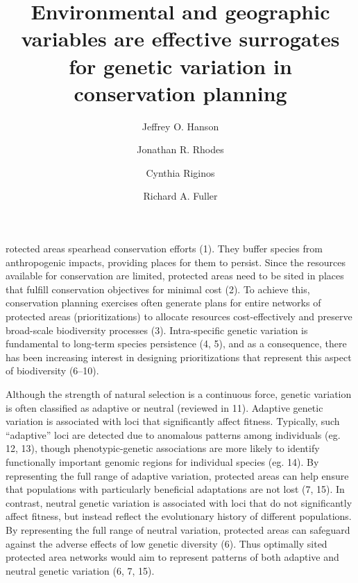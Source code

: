 \documentclass[9pt,twocolumn,twoside,lineno]{pnas-new}
\title{Environmental and geographic variables are effective surrogates for
genetic variation in conservation planning}
\author[a,1]{Jeffrey O. Hanson}
\author[b]{Jonathan R. Rhodes}
\author[a]{Cynthia Riginos}
\author[a]{Richard A. Fuller}
\affil[a]{School of Biological Sciences, The University of Queensland, Brisbane,
QLD, Australia}
\affil[b]{School of Earth and Environmental Sciences, The University of
Queensland, Brisbane, QLD, Australia}
\begin{document}
\verticaladjustment{-2pt}

\maketitle
\thispagestyle{firststyle}



rotected areas spearhead conservation efforts (1). They
buffer species from anthropogenic impacts, providing places for them to
persist. Since the resources available for conservation are limited,
protected areas need to be sited in places that fulfill conservation
objectives for minimal cost (2). To achieve this, conservation planning
exercises often generate plans for entire networks of protected areas
(prioritizations) to allocate resources cost-effectively and preserve
broad-scale biodiversity processes (3). Intra-specific genetic variation
is fundamental to long-term species persistence (4, 5), and as a
consequence, there has been increasing interest in designing
prioritizations that represent this aspect of biodiversity (6--10).

Although the strength of natural selection is a continuous force,
genetic variation is often classified as adaptive or neutral (reviewed
in 11). Adaptive genetic variation is associated with loci that
significantly affect fitness. Typically, such ``adaptive'' loci are
detected due to anomalous patterns among individuals (eg. 12, 13),
though phenotypic-genetic associations are more likely to identify
functionally important genomic regions for individual species (eg. 14).
By representing the full range of adaptive variation, protected areas
can help ensure that populations with particularly beneficial
adaptations are not lost (7, 15). In contrast, neutral genetic variation
is associated with loci that do not significantly affect fitness, but
instead reflect the evolutionary history of different populations. By
representing the full range of neutral variation, protected areas can
safeguard against the adverse effects of low genetic diversity (6). Thus
optimally sited protected area networks would aim to represent patterns
of both adaptive and neutral genetic variation (6, 7, 15).
\end{document}
